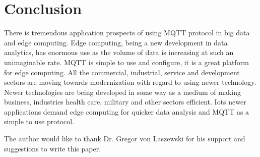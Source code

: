 \documentclass[sigconf]{acmart}
\begin{document}
\section{Conclusion}
There is tremendous application prospects of using MQTT protocol in big data and edge computing. Edge computing, being a new  development in data analytics,  has enormous use as the volume of data is increasing at such an unimaginable rate. MQTT is simple to use and configure, it is a great platform for edge computing. All the commercial, industrial, service and development sectors are moving towards modernization with regard to using newer technology. Newer technologies are being developed in some way as a medium of making business, industries health care, military and other sectors efficient. Iots newer applications demand edge computing for quicker data analysis and MQTT as a simple to use protocol.  


\begin{acks}

  The author would like to thank Dr. Gregor von Laszewski for his
  support and suggestions to write this paper.

\end{acks}


 
\end{document}
